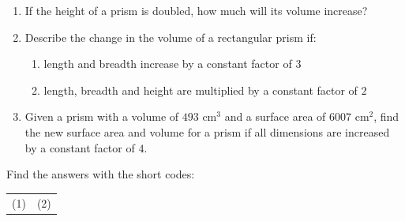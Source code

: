 \begin{exercises}{}
 {
\begin{enumerate}[noitemsep, label=\textbf{\arabic*}. ] 
 \item If the height of a prism is doubled, how much will its volume increase?
\item Describe the change in the volume of a rectangular prism if:
\begin{enumerate}[noitemsep, label=\textbf{(\alph*)} ] 
\item length and breadth increase by a constant factor of $3$
\item length, breadth and height are multiplied by a constant factor of $2$
\end{enumerate}
\item Given a prism with a volume of $493$ cm$^{3}$ and a surface area of $6007$ cm$^{2}$, 
find the new surface area and volume for a prism if all dimensions are increased by a constant factor of $4$. 
\end{enumerate}
\practiceinfo
{}
Find the answers with the short codes:\\
\begin{tabularx}{\textwidth}{ XX }
(1)	&	(2)
\end{tabularx}
}
\end{exercises}

